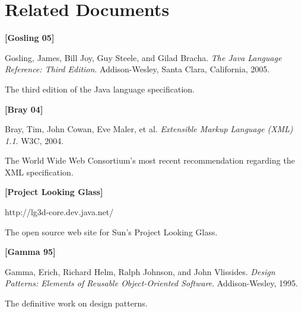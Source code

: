 \documentclass[letterpaper, titlepage, 11pt]{article}
\begin{document}
\section{Related Documents}
\begin{list}{}{
\setlength{\parsep}{1ex}
\setlength{\leftmargin}{0.5in}
\setlength{\itemindent}{-0.5in}
}

\item[] \textbf{[Gosling 05]}

	Gosling, James, Bill Joy, Guy Steele, and Gilad Bracha. \textit{The Java
	Language Reference: Third Edition}. Addison-Wesley, Santa Clara, California, 2005.

	The third edition of the Java language specification.

\item[] \textbf{[Bray 04]}

	Bray, Tim, John Cowan, Eve Maler, et al. \textit{Extensible Markup
	Language (XML) 1.1}. W3C, 2004.

	The World Wide Web Consortium's most recent recommendation regarding the
	XML specification.

\item[] \textbf{[Project Looking Glass]}

	http://lg3d-core.dev.java.net/

	The open source web site for Sun's Project Looking Glass.

\item[] \textbf{[Gamma 95]}

	Gamma, Erich, Richard Helm, Ralph Johnson, and John Vlissides.
	\textit{Design Patterns: Elements of Reusable Object-Oriented
	Software}. Addison-Wesley, 1995.

	The definitive work on design patterns.
\end{list}
\end{document}
